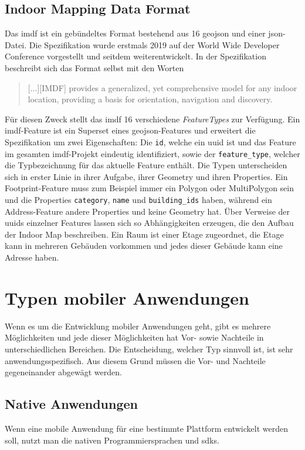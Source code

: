 \subsection{Indoor Mapping Data Format}
Das \ac{imdf} ist ein gebündeltes Format bestehend aus 16 \ac{geojson} und einer \ac{json}-Datei. Die Spezifikation wurde erstmals 2019 auf der World Wide Developer Conference vorgestellt \parencite{GOD2019} und seitdem weiterentwickelt. In der Spezifikation beschreibt sich das Format selbst mit den Worten \blockquote{[...][IMDF] provides a generalized, yet comprehensive model for any indoor location, providing a basis for orientation, navigation and discovery.} \parencite{HOA2019}\pbreak%
%
Für diesen Zweck stellt das \ac{imdf} 16 verschiedene \textit{FeatureTypes} zur Verfügung. Ein \ac{imdf}-Feature ist ein Superset eines \ac{geojson}-Features und erweitert die Spezifikation um zwei Eigenschaften: Die \texttt{id}, welche ein \ac{uuid} ist und das Feature im gesamten \ac{imdf}-Projekt eindeutig identifiziert, sowie der \texttt{feature\_type}, welcher die Typbezeichnung für das aktuelle Feature enthält.
Die Typen unterscheiden sich in erster Linie in ihrer Aufgabe, ihrer Geometry und ihren Properties. Ein Footprint-Feature muss zum Beispiel immer ein Polygon oder MultiPolygon sein und die Properties \texttt{category}, \texttt{name} und \texttt{building\_ids} haben, während ein Address-Feature andere Properties und keine Geometry hat.\pbreak%
%
Über Verweise der \ac{uuid}s einzelner Features lassen sich so Abhängigkeiten erzeugen, die den Aufbau der Indoor Map beschreiben. Ein Raum ist einer Etage zugeordnet, die Etage kann in mehreren Gebäuden vorkommen und jedes dieser Gebäude kann eine Adresse haben.

\section{Typen mobiler Anwendungen}
Wenn es um die Entwicklung mobiler Anwendungen geht, gibt es mehrere Möglichkeiten und jede dieser Möglichkeiten hat Vor- sowie Nachteile in unterschiedlichen Bereichen. Die Entscheidung, welcher Typ sinnvoll ist, ist sehr anwendungsspezifisch. Aus diesem Grund müssen die Vor- und Nachteile gegeneinander abgewägt werden.

\subsection{Native Anwendungen}
Wenn eine mobile Anwendung für eine bestimmte Plattform entwickelt werden soll, nutzt man die nativen Programmiersprachen und \Glspl{sdk}.

